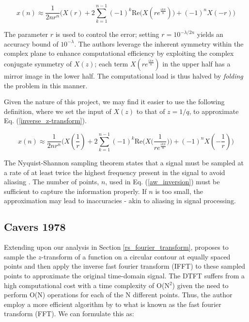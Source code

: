 \documentclass[a4paper]{report}
\begin{document}
\begin{equation}\label{aw_inversion_original}
	x(n) \approx \frac{1}{2nr^n} \biggr( X(r) + 2\sum^{n-1}_{k = 1} (-1)^k \mathrm{Re}\bigg( X(re^{\frac{ik\pi}{n}})\bigg) + (-1)^nX(-r) \biggl)
\end{equation}

The parameter $r$ is used to control the error; setting $r = 10^{-\lambda / 2n}$ yields an accuracy bound of $10^{-\lambda}$. The authors leverage the inherent symmetry within the complex plane to enhance computational efficiency by exploiting the complex conjugate symmetry of $X(z)$; each term $X(re^{\frac{ik\pi}{n}})$ in the upper half has a mirror image in the lower half. The computational load is thus halved by \textit{folding} the problem in this manner.

Given the nature of this project, we may find it easier to use the following definition, where we set the input of $X(z)$ to that of $z = 1 / q$, to approximate Eq. (\ref{inverse_z-transform}).

\begin{equation}\label{aw_inversion}
	x(n) \approx \frac{1}{2nr^n} \biggr( X(\frac{1}{r}) + 2\sum^{n-1}_{k = 1} (-1)^k \text{Re}\bigg( X\big(\frac{1}{re^{\frac{ik\pi}{n}}}\big)\bigg) + (-1)^nX(-\frac{1}{r}) \biggl)
\end{equation}

The Nyquist-Shannon sampling theorem states that a signal must be sampled at a rate of at least twice the highest frequency present in the signal to avoid aliasing \citep{shannon1949communication,nyquist1928certain}. The number of points, $n$, used in Eq. (\ref{aw_inversion}) must be sufficient to capture the information properly. If $n$ is too small, the approximation may lead to inaccuracies - akin to aliasing in signal processing.

\subsection{Cavers 1978}\label{cavers_section}
Extending upon our analysis in Section \ref{rs_fourier_transform}, \citet{Cavers1978FFT} proposes to sample the $z$-transform of a function on a circular contour at equally spaced points and then apply the inverse fast fourier transform (IFFT) to these sampled points to approximate the original time-domain signal. The DTFT suffers from a high computational cost with a time complexity of O(N$^2$) given the need to perform O(N) operations for each of the N different points. Thus, the author employ a more efficient algorithm by \citet{cooley1965algorithm} to what is known as the fast fourier transform (FFT). We can formulate this as:
\end{document}

